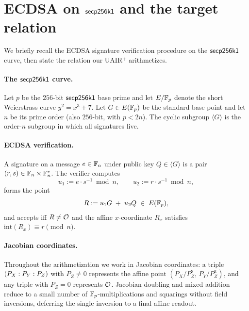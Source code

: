 \section{ECDSA on $\mathsf{secp256k1}$ and the target relation}\label{sec:overview}

We briefly recall the ECDSA signature verification procedure on the
$\mathsf{secp256k1}$ curve, then state the relation our UAIR$^+$ arithmetizes.

\paragraph{The $\mathsf{secp256k1}$ curve.}
Let $p$ be the $256$-bit $\mathsf{secp256k1}$ base prime and let $E/\mathbb{F}_p$ denote
the short Weierstrass curve $y^2 = x^3 + 7$. Let $G \in E(\mathbb{F}_p)$ be
the standard base point and let $n$ be its prime order (also $256$-bit,
with $p < 2n$). The cyclic subgroup $\langle G \rangle$ is the order-$n$
subgroup in which all signatures live.

\paragraph{ECDSA verification.}
A signature on a message $e \in \mathbb{F}_n$ under public key $Q \in \langle G \rangle$
is a pair $(r, s) \in \mathbb{F}_n \times \mathbb{F}_n^\ast$. The verifier computes
$$
u_1 := e \cdot s^{-1} \bmod n, \qquad u_2 := r \cdot s^{-1} \bmod n,
$$
forms the point
$$
R := u_1 G \;+\; u_2 Q \;\in\; E(\mathbb{F}_p),
$$
and accepts iff $R \neq \mathcal{O}$ and the affine $x$-coordinate $R_x$
satisfies $\mathrm{int}(R_x) \equiv r \pmod n$.

\paragraph{Jacobian coordinates.}
Throughout the arithmetization we work in Jacobian coordinates: a triple
$(P_X : P_Y : P_Z)$ with $P_Z \neq 0$ represents the affine point
$(P_X / P_Z^2,\, P_Y / P_Z^3)$, and any triple with $P_Z = 0$
represents $\mathcal{O}$. Jacobian doubling and mixed addition reduce to a
small number of $\mathbb{F}_p$-multiplications and squarings without field
inversions, deferring the single inversion to a final affine readout.


